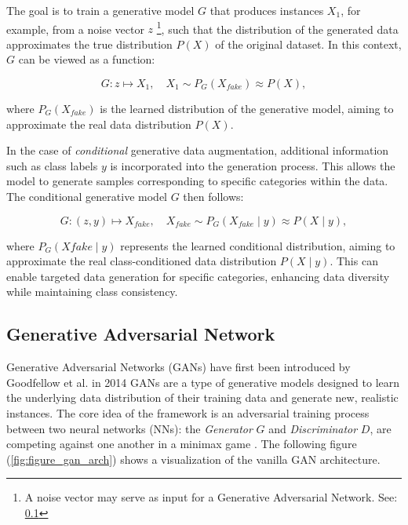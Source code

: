 The goal is to train a generative model \( G \) that produces instances \( X_1 \), for example, from a noise vector \( z \) \footnote{A noise vector may serve as input for a Generative Adversarial Network. See: \ref{theoretical_gan}}, such that the distribution of the generated data approximates the true distribution \( P(X) \) of the original dataset. In this context, \( G \) can be viewed as a function:

\[
G: z \mapsto X_1, \quad X_1 \sim P_G(X_{fake}) \approx P(X),
\]

\noindent
where \( P_G(X_{fake}) \) is the learned distribution of the generative model, aiming to approximate the real data distribution \( P(X) \).

In the case of \textit{conditional} generative data augmentation, additional information such as class labels \( y \) is incorporated into the generation process. This allows the model to generate samples corresponding to specific categories within the data. The conditional generative model \( G \) then follows:

\[
G: (z, y) \mapsto X_{fake}, \quad X_{fake} \sim P_G(X_{fake} \mid y) \approx P(X \mid y),
\]

\noindent
where \( P_G(X{fake} \mid y) \) represents the learned conditional distribution, aiming to approximate the real class-conditioned data distribution \( P(X \mid y) \). This can enable targeted data generation for specific categories, enhancing data diversity while maintaining class consistency.





\subsection[Generative Adversarial Network - GAN]{Generative Adversarial Network}\label{theoretical_gan}
Generative Adversarial Networks (GANs) have first been introduced by Goodfellow et al. in 2014 \cite{goodfellow2014generativeadversarialnetworks} GANs are a type of generative models designed to learn the underlying data distribution of their training data and generate new, realistic instances. The core idea of the framework is an adversarial training process between two neural networks (NNs): the \textit{Generator} \(G\) and \textit{Discriminator} \(D\), are competing against one another in a minimax game \cite{VonNeumann1928Minimax}. The following figure (\ref{fig:figure_gan_arch}) shows a visualization of the vanilla GAN architecture.

